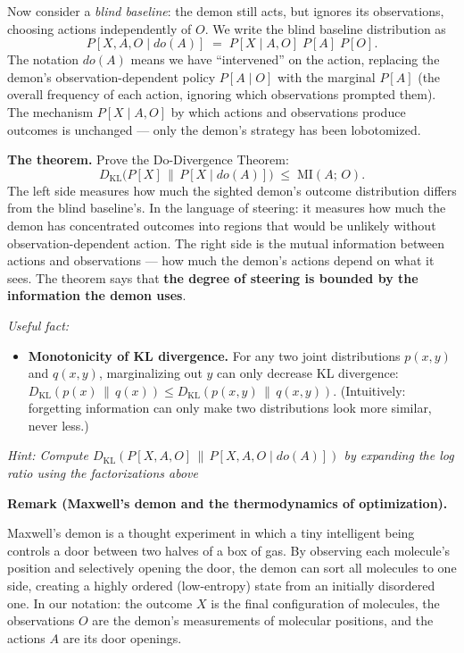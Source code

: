 \documentclass[11pt]{article}
\begin{document}
\begin{exercise}
\medskip
\noindent
Now consider a \emph{blind baseline}: the demon still acts, but ignores its
observations, choosing actions independently of $O$. We write the blind baseline
distribution as
\[
  P[X, A, O \mid do(A)] \;=\; P[X \mid A, O]\; P[A]\; P[O].
\]
The notation $do(A)$ means we have ``intervened'' on the action, replacing the
demon's observation-dependent policy $P[A \mid O]$ with the marginal $P[A]$ (the
overall frequency of each action, ignoring which observations prompted them). The
mechanism $P[X \mid A, O]$ by which actions and observations produce outcomes is
unchanged --- only the demon's strategy has been lobotomized.

\medskip
\noindent
\textbf{The theorem.} Prove the Do-Divergence Theorem:
\[
  D_{\mathrm{KL}}\bigl(P[X] \,\big\|\, P[X \mid do(A)]\bigr)
  \;\leq\; \mathrm{MI}(A;\, O).
\]
The left side measures how much the sighted demon's outcome distribution differs from
the blind baseline's. In the language of steering: it measures how much the demon has
concentrated outcomes into regions that would be unlikely without observation-dependent
action. The right side is the mutual information between actions and observations ---
how much the demon's actions depend on what it sees. The theorem says that \textbf{the
degree of steering is bounded by the information the demon uses}.

\medskip
\noindent
\emph{Useful fact:}
\begin{itemize}
  \item \textbf{Monotonicity of KL divergence.} For any two joint distributions
    $p(x,y)$ and $q(x,y)$, marginalizing out $y$ can only decrease KL divergence:
    $D_{\mathrm{KL}}(p(x) \,\|\, q(x)) \leq D_{\mathrm{KL}}(p(x,y) \,\|\, q(x,y))$.
    (Intuitively: forgetting information can only make two distributions look more
    similar, never less.)
\end{itemize}

\medskip
\noindent
\emph{Hint: Compute $D_{\mathrm{KL}}(P[X, A, O] \,\|\, P[X, A, O \mid do(A)])$
by expanding the log ratio using the factorizations above}

\medskip
\noindent
\textbf{Remark (Maxwell's demon and the thermodynamics of optimization).}

\medskip
\noindent
Maxwell's demon is a thought experiment in which a tiny intelligent being controls a
door between two halves of a box of gas. By observing each molecule's position and
selectively opening the door, the demon can sort all molecules to one side, creating a
highly ordered (low-entropy) state from an initially disordered one. In our notation:
the outcome $X$ is the final configuration of molecules, the observations $O$ are the
demon's measurements of molecular positions, and the actions $A$ are its door
openings.


\end{exercise}
\end{document}
